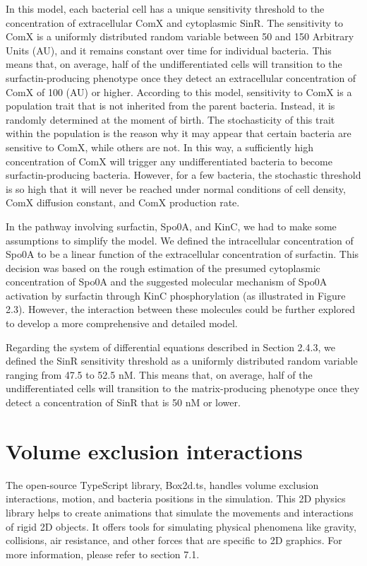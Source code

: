 In this model, each bacterial cell has a unique sensitivity threshold to the concentration of extracellular ComX and cytoplasmic SinR. The sensitivity to ComX is a uniformly distributed random variable between 50 and 150 Arbitrary Units (AU), and it remains constant over time for individual bacteria. This means that, on average, half of the undifferentiated cells will transition to the surfactin-producing phenotype once they detect an extracellular concentration of ComX of 100 (AU) or higher. According to this model, sensitivity to ComX is a population trait that is not inherited from the parent bacteria. Instead, it is randomly determined at the moment of birth. The stochasticity of this trait within the population is the reason why it may appear that certain bacteria are sensitive to ComX, while others are not. In this way, a sufficiently high concentration of ComX will trigger any undifferentiated bacteria to become surfactin-producing bacteria. However, for a few bacteria, the stochastic threshold is so high that it will never be reached under normal conditions of cell density, ComX diffusion constant, and ComX production rate.

In the pathway involving surfactin, Spo0A, and KinC, we had to make some assumptions to simplify the model. We defined the intracellular concentration of Spo0A to be a linear function of the extracellular concentration of surfactin. This decision was based on the rough estimation of the presumed cytoplasmic concentration of Spo0A and the suggested molecular mechanism of Spo0A activation by surfactin through KinC phosphorylation (as illustrated in Figure 2.3). However, the interaction between these molecules could be further explored to develop a more comprehensive and detailed model.

Regarding the system of differential equations described in Section 2.4.3, we defined the SinR sensitivity threshold as a uniformly distributed random variable ranging from 47.5 to 52.5 nM. This means that, on average, half of the undifferentiated cells will transition to the matrix-producing phenotype once they detect a concentration of SinR that is 50 nM or lower.

\section{Volume exclusion interactions}\label{sec:contrib1:theme2}

The open-source TypeScript library, Box2d.ts, handles volume exclusion interactions, motion, and bacteria positions in the simulation. This 2D physics library helps to create animations that simulate the movements and interactions of rigid 2D objects. It offers tools for simulating physical phenomena like gravity, collisions, air resistance, and other forces that are specific to 2D graphics.{\footnotesize\cite{Catto2023}} For more information, please refer to section 7.1.

